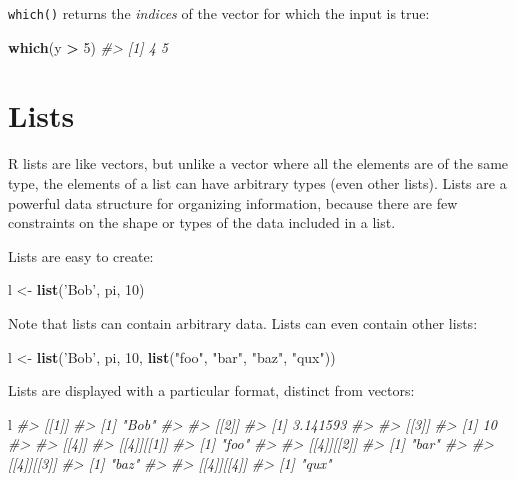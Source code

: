 \documentclass[]{book}
\newenvironment{Shaded}{\begin{snugshade}}{\end{snugshade}}
\newcommand{\CommentTok}[1]{\textcolor[rgb]{0.56,0.35,0.01}{\textit{#1}}}
\newcommand{\DecValTok}[1]{\textcolor[rgb]{0.00,0.00,0.81}{#1}}
\newcommand{\KeywordTok}[1]{\textcolor[rgb]{0.13,0.29,0.53}{\textbf{#1}}}
\newcommand{\NormalTok}[1]{#1}
\newcommand{\OperatorTok}[1]{\textcolor[rgb]{0.81,0.36,0.00}{\textbf{#1}}}
\newcommand{\StringTok}[1]{\textcolor[rgb]{0.31,0.60,0.02}{#1}}
\theoremstyle{definition}
\theoremstyle{definition}
\theoremstyle{definition}
\theoremstyle{remark}
\begin{document}
\texttt{which()} returns the \emph{indices} of the vector for which the
input is true:

\begin{Shaded}
\begin{Highlighting}[]
\KeywordTok{which}\NormalTok{(y }\OperatorTok{>}\StringTok{ }\DecValTok{5}\NormalTok{)}
\CommentTok{#> [1] 4 5}
\end{Highlighting}
\end{Shaded}

\hypertarget{lists}{%
\section{Lists}\label{lists}}

R lists are like vectors, but unlike a vector where all the elements are
of the same type, the elements of a list can have arbitrary types (even
other lists). Lists are a powerful data structure for organizing
information, because there are few constraints on the shape or types of
the data included in a list.

Lists are easy to create:

\begin{Shaded}
\begin{Highlighting}[]
\NormalTok{l <-}\StringTok{ }\KeywordTok{list}\NormalTok{(}\StringTok{'Bob'}\NormalTok{, pi, }\DecValTok{10}\NormalTok{)}
\end{Highlighting}
\end{Shaded}

Note that lists can contain arbitrary data. Lists can even contain other
lists:

\begin{Shaded}
\begin{Highlighting}[]
\NormalTok{l <-}\StringTok{ }\KeywordTok{list}\NormalTok{(}\StringTok{'Bob'}\NormalTok{, pi, }\DecValTok{10}\NormalTok{, }\KeywordTok{list}\NormalTok{(}\StringTok{"foo"}\NormalTok{, }\StringTok{"bar"}\NormalTok{, }\StringTok{"baz"}\NormalTok{, }\StringTok{"qux"}\NormalTok{))}
\end{Highlighting}
\end{Shaded}

Lists are displayed with a particular format, distinct from vectors:

\begin{Shaded}
\begin{Highlighting}[]
\NormalTok{l}
\CommentTok{#> [[1]]}
\CommentTok{#> [1] "Bob"}
\CommentTok{#> }
\CommentTok{#> [[2]]}
\CommentTok{#> [1] 3.141593}
\CommentTok{#> }
\CommentTok{#> [[3]]}
\CommentTok{#> [1] 10}
\CommentTok{#> }
\CommentTok{#> [[4]]}
\CommentTok{#> [[4]][[1]]}
\CommentTok{#> [1] "foo"}
\CommentTok{#> }
\CommentTok{#> [[4]][[2]]}
\CommentTok{#> [1] "bar"}
\CommentTok{#> }
\CommentTok{#> [[4]][[3]]}
\CommentTok{#> [1] "baz"}
\CommentTok{#> }
\CommentTok{#> [[4]][[4]]}
\CommentTok{#> [1] "qux"}
\end{Highlighting}
\end{Shaded}
\end{document}
